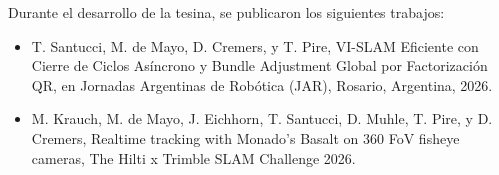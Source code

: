Durante el desarrollo de la tesina, se publicaron los siguientes trabajos:
\begin{itemize}
    \item T. Santucci, M. de Mayo, D. Cremers, y T. Pire, VI-SLAM Eficiente con Cierre de Ciclos Asíncrono y Bundle Adjustment Global por Factorización QR, en Jornadas Argentinas de Robótica (JAR), Rosario, Argentina, 2026.
    \item M. Krauch, M. de Mayo, J. Eichhorn, T. Santucci, D. Muhle, T. Pire, y D. Cremers, Realtime tracking with Monado's Basalt on 360 FoV fisheye cameras, The Hilti x Trimble SLAM Challenge 2026.
\end{itemize}
